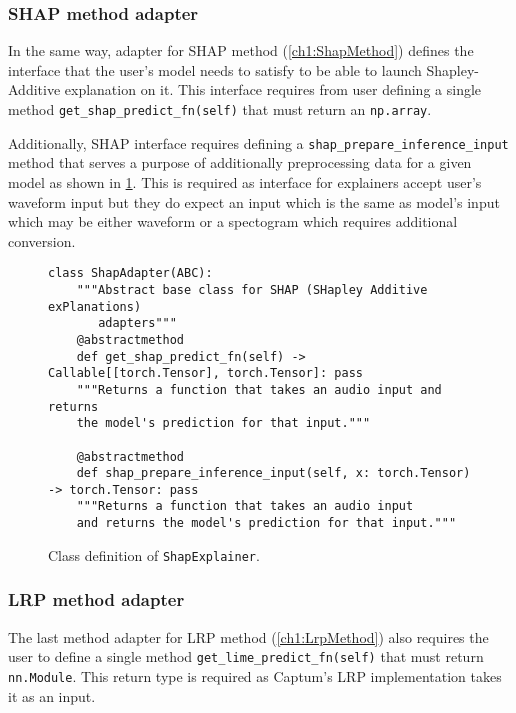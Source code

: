 \documentclass[
    bindingoffset=5mm,  %
    footnoteindent=3mm, %
    hyphenation=true    %
]{src/wut-thesis}
\begin{document}
\subsubsection{SHAP method adapter}

    In the same way, adapter for SHAP method (\ref{ch1:ShapMethod}) defines the interface that the user's model needs to satisfy to be able to launch Shapley-Additive explanation on it.
    This interface requires from user defining a single method \texttt{get_shap_predict_fn(self)}
    that must return an \texttt{np.array}.

    Additionally, SHAP interface requires defining a \texttt{shap_prepare_inference_input} method that serves a purpose of additionally preprocessing data for a given model as shown in \ref{fig:ShapAdapter}.
    This is required as interface for explainers accept user's waveform input but they do expect an input which is the same as model's input which may be either waveform or a spectogram which requires additional conversion.

\begin{figure}%
\begin{verbatim}
class ShapAdapter(ABC):
    """Abstract base class for SHAP (SHapley Additive exPlanations)
       adapters"""
    @abstractmethod
    def get_shap_predict_fn(self) -> Callable[[torch.Tensor], torch.Tensor]: pass
    """Returns a function that takes an audio input and returns
    the model's prediction for that input."""

    @abstractmethod
    def shap_prepare_inference_input(self, x: torch.Tensor) -> torch.Tensor: pass
    """Returns a function that takes an audio input
    and returns the model's prediction for that input."""
\end{verbatim}
\caption{Class definition of \texttt{ShapExplainer}.}
\label{fig:ShapAdapter}
\end{figure}

\subsubsection{LRP method adapter}

    The last method adapter for LRP method (\ref{ch1:LrpMethod}) also requires the user to define a single method \texttt{get_lime_predict_fn(self)} that must return \texttt{nn.Module}. This return type is required as Captum's LRP implementation takes it as an input.
\end{document}
